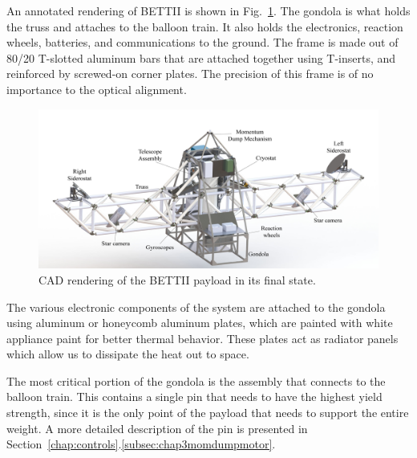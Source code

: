 An annotated rendering of BETTII is shown in Fig.~\ref{fig:BETTIICAD}. The gondola is what holds the truss and attaches to the balloon train. It also holds the electronics, reaction wheels, batteries, and communications to the ground. The frame is made out of 80/20 T-slotted aluminum bars that are attached together using T-inserts, and reinforced by screwed-on corner plates. The precision of this frame is of no importance to the optical alignment. 


\begin{figure}[!ht]
	\centering
	\includegraphics[width=\textwidth]{Figures/BETTII-annotated.jpg} 
	\caption[BETTII Rendering]{CAD rendering of the BETTII payload in its final state.}
	\label{fig:BETTIICAD}
    \end{figure}



The various electronic components of the system are attached to the gondola using aluminum or honeycomb aluminum plates, which are painted with white appliance paint for better thermal behavior. These plates act as radiator panels which allow us to dissipate the heat out to space.

The most critical portion of the gondola is the assembly that connects to the balloon train. This contains a single pin that needs to have the highest yield strength, since it is the only point of the payload that needs to support the entire weight. A more detailed description of the pin is presented in Section~\ref{chap:controls}.\ref{subsec:chap3momdumpmotor}.

